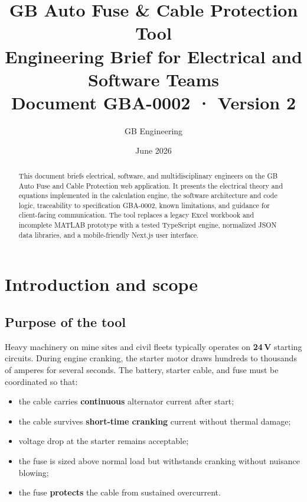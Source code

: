\documentclass[11pt,a4paper]{report}
\title{%
  \textbf{GB Auto Fuse \& Cable Protection Tool}\\[0.4em]
  \large Engineering Brief for Electrical and Software Teams\\[0.2em]
  \normalsize Document GBA-0002 · Version 2
}
\author{GB Engineering}
\date{June 2026}
\begin{document}
\maketitle

\begin{abstract}
This document briefs electrical, software, and multidisciplinary engineers on the GB Auto Fuse and Cable Protection web application. It presents the electrical theory and equations implemented in the calculation engine, the software architecture and code logic, traceability to specification GBA-0002, known limitations, and guidance for client-facing communication. The tool replaces a legacy Excel workbook and incomplete MATLAB prototype with a tested TypeScript engine, normalized JSON data libraries, and a mobile-friendly Next.js user interface.
\end{abstract}

\tableofcontents
\newpage

\chapter{Introduction and scope}

\section{Purpose of the tool}

Heavy machinery on mine sites and civil fleets typically operates on \textbf{24\,V} starting circuits. During engine cranking, the starter motor draws hundreds to thousands of amperes for several seconds. The battery, starter cable, and fuse must be coordinated so that:

\begin{itemize}[noitemsep]
  \item the cable carries \textbf{continuous} alternator current after start;
  \item the cable survives \textbf{short-time cranking} current without thermal damage;
  \item voltage drop at the starter remains acceptable;
  \item the fuse is sized above normal load but withstands cranking without nuisance blowing;
  \item the fuse \textbf{protects} the cable from sustained overcurrent.
\end{itemize}
\end{document}
